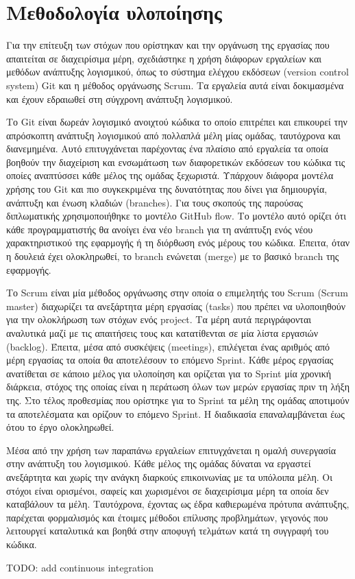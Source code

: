\section{Μεθοδολογία υλοποίησης}

Για την επίτευξη των στόχων που ορίστηκαν και την οργάνωση της εργασίας που απαιτείται σε διαχειρίσιμα μέρη, σχεδιάστηκε η χρήση διάφορων εργαλείων και μεθόδων ανάπτυξης λογισμικού, όπως το σύστημα ελέγχου εκδόσεων (version control system) Git και η μέθοδος οργάνωσης Scrum. Τα εργαλεία αυτά είναι δοκιμασμένα και έχουν εδραιωθεί στη σύγχρονη ανάπτυξη λογισμικού.

Το Git είναι δωρεάν λογισμικό ανοιχτού κώδικα το οποίο επιτρέπει και επικουρεί την απρόσκοπτη ανάπτυξη λογισμικού από πολλαπλά μέλη μίας ομάδας, ταυτόχρονα και διανεμημένα. Αυτό επιτυγχάνεται παρέχοντας ένα πλαίσιο από εργαλεία τα οποία βοηθούν την διαχείριση και ενσωμάτωση των διαφορετικών εκδόσεων του κώδικα τις οποίες αναπτύσσει κάθε μέλος της ομάδας ξεχωριστά. Υπάρχουν διάφορα μοντέλα χρήσης του Git και πιο συγκεκριμένα της δυνατότητας που δίνει για δημιουργία, ανάπτυξη και ένωση κλαδιών (branches). Για τους σκοπούς της παρούσας διπλωματικής χρησιμοποιήθηκε το μοντέλο GitHub flow\cite{4.2-github-flow}. Το μοντέλο αυτό ορίζει ότι κάθε προγραμματιστής θα ανοίγει ένα νέο branch για τη ανάπτυξη ενός νέου χαρακτηριστικού της εφαρμογής ή τη διόρθωση ενός μέρους του κώδικα. Έπειτα, όταν η δουλειά έχει ολοκληρωθεί, το branch ενώνεται (merge) με το βασικό branch της εφαρμογής.

Το Scrum είναι μία μέθοδος οργάνωσης στην οποία ο επιμελητής του Scrum (Scrum master) διαχωρίζει τα ανεξάρτητα μέρη εργασίας (tasks) που πρέπει να υλοποιηθούν για την ολοκλήρωση των στόχων ενός project. Τα μέρη αυτά περιγράφονται αναλυτικά μαζί με τις απαιτήσεις τους και κατατίθενται σε μία λίστα εργασιών (backlog). Έπειτα, μέσα από συσκέψεις (meetings), επιλέγεται ένας αριθμός από μέρη εργασίας τα οποία θα αποτελέσουν το επόμενο Sprint. Κάθε μέρος εργασίας ανατίθεται σε κάποιο μέλος για υλοποίηση και ορίζεται για το Sprint μία χρονική διάρκεια, στόχος της οποίας είναι η περάτωση όλων των μερών εργασίας πριν τη λήξη της. Στο τέλος προθεσμίας που ορίστηκε για το Sprint τα μέλη της ομάδας αποτιμούν τα αποτελέσματα και ορίζουν το επόμενο Sprint. Η διαδικασία επαναλαμβάνεται έως ότου το έργο ολοκληρωθεί.

Μέσα από την χρήση των παραπάνω εργαλείων επιτυγχάνεται η ομαλή συνεργασία στην ανάπτυξη του λογισμικού. Κάθε μέλος της ομάδας δύναται να εργαστεί ανεξάρτητα και χωρίς την ανάγκη διαρκούς επικοινωνίας με τα υπόλοιπα μέλη. Οι στόχοι είναι ορισμένοι, σαφείς και χωρισμένοι σε διαχειρίσιμα μέρη τα οποία δεν καταβάλουν τα μέλη. Ταυτόχρονα, έχοντας ως έδρα καθιερωμένα πρότυπα ανάπτυξης, παρέχεται φορμαλισμός και έτοιμες μέθοδοι επίλυσης προβλημάτων, γεγονός που λειτουργεί καταλυτικά και βοηθά στην αποφυγή τελμάτων κατά τη συγγραφή του κώδικα.

TODO: add continuous integration
